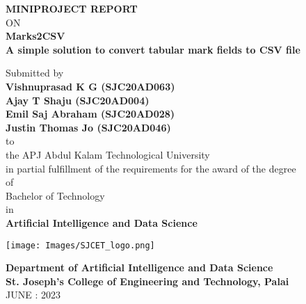\newpage %

\thispagestyle{empty}
\begin{center}
 
{\normalsize \bf MINIPROJECT REPORT}\\
ON\\
\vspace*{0.2 cm}
{\huge \bf Marks2CSV}\\
{\normalsize \bf A simple solution to convert tabular mark fields to CSV file}

   \vspace{0.5 cm}
   \large Submitted by\\
   { \bf Vishnuprasad K G (SJC20AD063)}\\
   { \bf Ajay T Shaju (SJC20AD004)}\\
   { \bf Emil Saj Abraham (SJC20AD028)}\\
   { \bf Justin Thomas Jo (SJC20AD046)}\\[-0.6mm]
  {\large to\\[-0.6mm] the APJ Abdul Kalam Technological University\\[-0.6mm] in partial fulfillment of the requirements for the award of the degree\\[-0.6mm] of\\[-0.6mm] Bachelor of Technology\\[-0.6mm] in\\[-0.6mm] {\bf Artificial Intelligence and Data Science}}
  
   \begin{center}
   \texttt{[image: Images/SJCET\_logo.png]}
   \end{center}
   \vspace*{-0.5cm}
  {\LARGE {\bf Department of Artificial Intelligence and Data Science}}\\
          [-3mm] {\large {\bf St. Joseph's College of Engineering and Technology, Palai}\\
           [1mm] JUNE : 2023}

\end{center}



\newpage

